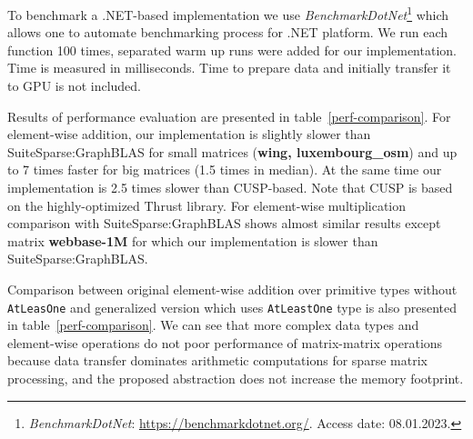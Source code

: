 To benchmark a .NET-based implementation we use \textit{BenchmarkDotNet}\footnote{\textit{BenchmarkDotNet}: \url{https://benchmarkdotnet.org/}. Access date: 08.01.2023.} which allows one to automate benchmarking process for .NET platform.
We run each function 100 times, separated warm up runs were added for our implementation. 
Time is measured in milliseconds. Time to prepare data and initially transfer it to GPU is not included.

Results of performance evaluation are presented in table~\ref{perf-comparison}.
For element-wise addition, our implementation is slightly slower than SuiteSparse:GraphBLAS for small matrices (\textbf{wing, luxembourg\_osm}) and up to 7 times faster for big matrices (1.5 times in median). At the same time our implementation is 2.5 times slower than CUSP-based. Note that CUSP is based on the highly-optimized Thrust library. For element-wise multiplication comparison with SuiteSparse:GraphBLAS shows almost similar results except matrix \textbf{webbase-1M} for which our implementation is slower than SuiteSparse:GraphBLAS.

Comparison between original element-wise addition over primitive types without \texttt{AtLeasOne} and generalized version which uses \texttt{AtLeastOne} type is also presented in table~\ref{perf-comparison}.
We can see that more complex data types and element-wise operations do not poor performance of matrix-matrix operations because data transfer dominates arithmetic computations for sparse matrix processing, and the proposed abstraction does not increase the memory footprint.